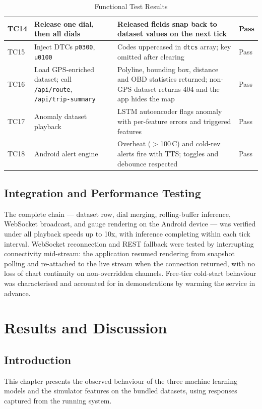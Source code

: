 \documentclass[10pt,a4paper]{report}
\begin{document}
\begin{table}[H]
\begin{tabularx}{\textwidth}{|l|X|X|l|}
TC14 & Release one dial, then all dials & Released fields snap back to dataset values on the next tick & Pass \\ \hline
TC15 & Inject DTCs \texttt{p0300}, \texttt{u0100} & Codes uppercased in \texttt{dtcs} array; key omitted after clearing & Pass \\ \hline
TC16 & Load GPS-enriched dataset; call \texttt{/api/route}, \texttt{/api/trip-summary} & Polyline, bounding box, distance and OBD statistics returned; non-GPS dataset returns 404 and the app hides the map & Pass \\ \hline
TC17 & Anomaly dataset playback & LSTM autoencoder flags anomaly with per-feature errors and triggered features & Pass \\ \hline
TC18 & Android alert engine & Overheat ($>$100\,\textdegree{}C) and cold-rev alerts fire with TTS; toggles and debounce respected & Pass \\ \hline
\end{tabularx}
\caption{Functional Test Results}
\end{table}

\section{Integration and Performance Testing}

The complete chain — dataset row, dial merging, rolling-buffer inference, WebSocket broadcast, and gauge rendering on the Android device — was verified under all playback speeds up to 10x, with inference completing within each tick interval. WebSocket reconnection and REST fallback were tested by interrupting connectivity mid-stream: the application resumed rendering from snapshot polling and re-attached to the live stream when the connection returned, with no loss of chart continuity on non-overridden channels. Free-tier cold-start behaviour was characterised and accounted for in demonstrations by warming the service in advance.

\chapter{Results and Discussion}
\section{Introduction}

This chapter presents the observed behaviour of the three machine learning models and the simulator features on the bundled datasets, using responses captured from the running system.
\end{document}
